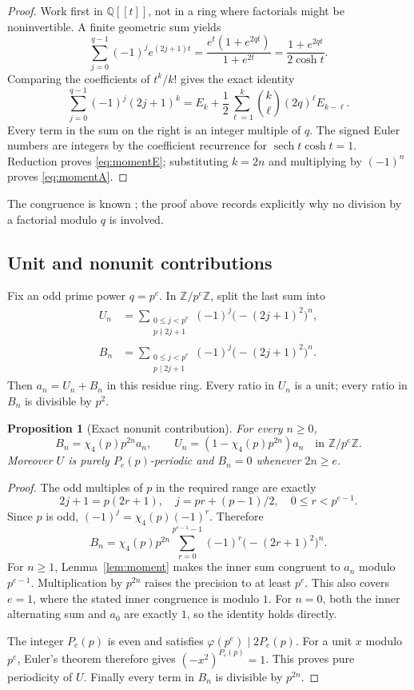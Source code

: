 \documentclass[11pt,a4paper]{article}
\numberwithin{equation}{section}
\newtheorem{proposition}[theorem]{Proposition}
\theoremstyle{definition}
\newcommand{\Z}{\mathbb Z}
\newcommand{\Q}{\mathbb Q}
\DeclareMathOperator{\sech}{sech}
\begin{document}
\begin{proof}
Work first in $\Q[[t]]$, not in a ring where factorials might be
noninvertible. A finite geometric sum yields
\[
\sum_{j=0}^{q-1}(-1)^j e^{(2j+1)t}
=\frac{e^t(1+e^{2qt})}{1+e^{2t}}
=\frac{1+e^{2qt}}{2\cosh t}.
\]
Comparing the coefficients of $t^k/k!$ gives the exact identity
\[
\sum_{j=0}^{q-1}(-1)^j(2j+1)^k
=E_k+\frac12\sum_{\ell=1}^k\binom{k}{\ell}(2q)^\ell E_{k-\ell}.
\]
Every term in the sum on the right is an integer multiple of $q$.
The signed Euler numbers are integers by the coefficient recurrence for
$\sech t\cosh t=1$. Reduction proves \eqref{eq:momentE}; substituting
$k=2n$ and multiplying by $(-1)^n$ proves \eqref{eq:momentA}.
\end{proof}

The congruence is known \cite[Eq.~(1.1)]{sun}; the proof above records
explicitly why no division by a factorial modulo $q$ is involved.

\subsection{Unit and nonunit contributions}

Fix an odd prime power $q=p^e$. In $\Z/p^e\Z$, split the last sum into
\begin{align*}
 U_n&=\sum_{\substack{0\le j<p^e\\p\nmid2j+1}}
        (-1)^j\bigl(-(2j+1)^2\bigr)^n,\\
 B_n&=\sum_{\substack{0\le j<p^e\\p\mid2j+1}}
        (-1)^j\bigl(-(2j+1)^2\bigr)^n.
\end{align*}
Then $a_n=U_n+B_n$ in this residue ring. Every ratio in $U_n$ is a unit;
every ratio in $B_n$ is divisible by $p^2$.

\begin{proposition}[Exact nonunit contribution]\label{prop:depletion}
For every $n\ge0$,
\begin{equation}\label{eq:depletion}
 B_n=\chi_4(p)p^{2n}a_n,\qquad
 U_n=(1-\chi_4(p)p^{2n})a_n\quad\text{in }\Z/p^e\Z.
\end{equation}
Moreover $U$ is purely $P_e(p)$-periodic and $B_n=0$ whenever $2n\ge e$.
\end{proposition}

\begin{proof}
The odd multiples of $p$ in the required range are exactly
\[
2j+1=p(2r+1),\quad
j=pr+(p-1)/2,\quad0\le r<p^{e-1}.
\]
Since $p$ is odd, $(-1)^j=\chi_4(p)(-1)^r$. Therefore
\[
 B_n=\chi_4(p)p^{2n}
 \sum_{r=0}^{p^{e-1}-1}(-1)^r\bigl(-(2r+1)^2\bigr)^n.
\]
For $n\ge1$, Lemma~\ref{lem:moment} makes the inner sum congruent to $a_n$
modulo $p^{e-1}$. Multiplication by $p^{2n}$ raises the precision to at
least $p^e$. This also covers $e=1$, where the stated inner congruence is
modulo $1$. For $n=0$, both the inner alternating sum and $a_0$ are
exactly $1$, so the identity holds directly.

The integer $P_e(p)$ is even and satisfies
$\varphi(p^e)\mid2P_e(p)$. For a unit $x$ modulo $p^e$, Euler's theorem
therefore gives
$(-x^2)^{P_e(p)}=1$. This proves pure periodicity of $U$.
Finally every term in $B_n$ is divisible by $p^{2n}$.
\end{proof}
\end{document}
